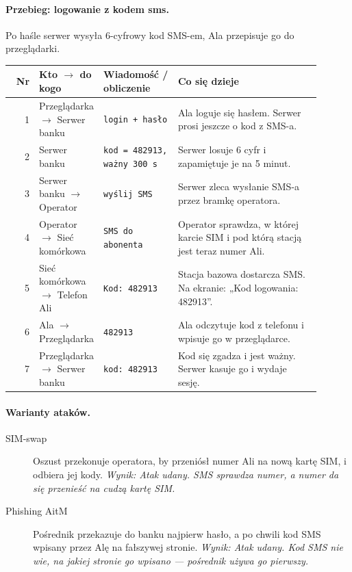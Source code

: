 \paragraph{Przebieg: logowanie z kodem sms.} Po haśle serwer wysyła 6-cyfrowy kod SMS-em, Ala przepisuje go do przeglądarki.
\begingroup\footnotesize
\begin{longtable}{@{}r p{0.2\linewidth} p{0.24\linewidth} p{0.46\linewidth}@{}}
\toprule
Nr & Kto $\rightarrow$ do kogo & Wiadomość / obliczenie & Co się dzieje \\
\midrule
\endhead
1 & Przeglądarka $\rightarrow$ Serwer banku & \texttt{login + hasło} & Ala loguje się hasłem. Serwer prosi jeszcze o kod z SMS-a. \\
2 & Serwer banku & \texttt{kod = 482913, ważny 300 s} & Serwer losuje 6 cyfr i zapamiętuje je na 5 minut. \\
3 & Serwer banku $\rightarrow$ Operator & \texttt{wyślij SMS} & Serwer zleca wysłanie SMS-a przez bramkę operatora. \\
4 & Operator $\rightarrow$ Sieć komórkowa & \texttt{SMS do abonenta} & Operator sprawdza, w której karcie SIM i pod którą stacją jest teraz numer Ali. \\
5 & Sieć komórkowa $\rightarrow$ Telefon Ali & \texttt{Kod: 482913} & Stacja bazowa dostarcza SMS. Na ekranie: „Kod logowania: 482913”. \\
6 & Ala $\rightarrow$ Przeglądarka & \texttt{482913} & Ala odczytuje kod z telefonu i wpisuje go w przeglądarce. \\
7 & Przeglądarka $\rightarrow$ Serwer banku & \texttt{kod: 482913} & Kod się zgadza i jest ważny. Serwer kasuje go i wydaje sesję. \\
\bottomrule
\end{longtable}
\endgroup

\paragraph{Warianty ataków.}
\begin{description}
\item[SIM-swap] Oszust przekonuje operatora, by przeniósł numer Ali na nową kartę SIM, i odbiera jej kody. \emph{Wynik: Atak udany. SMS sprawdza numer, a numer da się przenieść na cudzą kartę SIM.}
\item[Phishing AitM] Pośrednik przekazuje do banku najpierw hasło, a po chwili kod SMS wpisany przez Alę na fałszywej stronie. \emph{Wynik: Atak udany. Kod SMS nie wie, na jakiej stronie go wpisano — pośrednik używa go pierwszy.}
\end{description}


